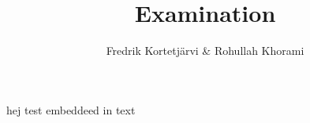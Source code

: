 \documentclass{article}
\title{Examination}
\author{Fredrik Kortetjärvi \& Rohullah Khorami}
\begin{document}
\maketitle
hej test\cite{DUMMY:1} embeddeed in text
\printbibliography
\end{document}
